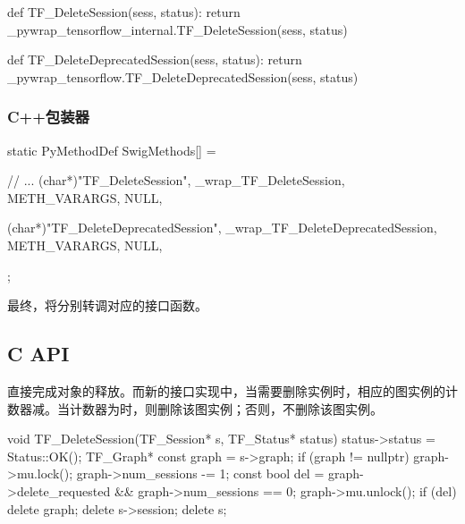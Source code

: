 \begin{content}
\begin{leftbar}
\begin{python}[caption={tensorflow/bazel-bin/tensorflow/python/pywrap\_tensorflow\_internal.py}]
def TF_DeleteSession(sess, status):
    return _pywrap_tensorflow_internal.TF_DeleteSession(sess, status)

def TF_DeleteDeprecatedSession(sess, status):
  return _pywrap_tensorflow.TF_DeleteDeprecatedSession(sess, status)
\end{python}
\end{leftbar}

\subsubsection{C++包装器}

\begin{leftbar}
\begin{c++}[caption={tensorflow/bazel-bin/tensorflow/python/pywrap\_tensorflow\_internal.cc}]
static PyMethodDef SwigMethods[] = {
  // ...
  { (char*)"TF_DeleteSession", 
    _wrap_TF_DeleteSession, METH_VARARGS, NULL},

  { (char*)"TF_DeleteDeprecatedSession", 
    _wrap_TF_DeleteDeprecatedSession, METH_VARARGS, NULL},
};
\end{c++}
\end{leftbar}

最终，将分别转调对应的接口函数。

\subsection{C API}

直接完成对象的释放。而新的接口实现中，当需要删除实例时，相应的图实例的计数器减。当计数器为时，则删除该图实例；否则，不删除该图实例。

\begin{leftbar}
\begin{c++}[caption={tensorflow/c/c\_api.c}]
void TF_DeleteSession(TF_Session* s, TF_Status* status) {
  status->status = Status::OK();
  TF_Graph* const graph = s->graph;
  if (graph != nullptr) {
    graph->mu.lock();
    graph->num_sessions -= 1;
    const bool del = graph->delete_requested && graph->num_sessions == 0;
    graph->mu.unlock();
    if (del) delete graph;
  }
  delete s->session;
  delete s;
}


\end{c++}
\end{leftbar}
\end{content}
